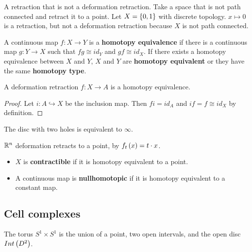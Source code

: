 \begin{example*}
A retraction that is not a deformation retraction. Take a space that is not path connected and retract it to a point. Let $ X = \left\{ 0, 1 \right\} $ with discrete topology. $ x \mapsto 0 $ is a retraction, but not a deformation retraction because $ X $ is not path connected.
\end{example*}

\begin{definition*}
A continuous map $ f : X \to Y $ is a \textbf{homotopy equivalence} if there is a continuous map $ g : Y \to X $ such that $ fg \cong id_Y $ and $ gf \cong id_X $. If there exists a homotopy equivalence between $ X $ and $ Y $, $ X $ and $ Y $ are \textbf{homotopy equivalent} or they have the same \textbf{homotopy type}.
\end{definition*}

\begin{lemma}
A deformation retraction $ f : X \to A $ is a homotopy equivalence.
\end{lemma}

\begin{proof}
Let $ i : A \hookrightarrow X $ be the inclusion map. Then $ fi = id_A $ and $ if = f \cong id_X $ by definition.
\end{proof}

\begin{example*}
The disc with two holes is equivalent to $ \infty $.
\end{example*}

\begin{example*}
$ \mathbb{R}^n $ deformation retracts to a point, by $ f_t\left( x \right) = t \cdot x $.
\end{example*}

\begin{definition*}
\hfill
\begin{itemize}
\item $ X $ is \textbf{contractible} if it is homotopy equivalent to a point.
\item A continuous map is \textbf{nullhomotopic} if it is homotopy equivalent to a constant map.
\end{itemize}
\end{definition*}

\subsection{Cell complexes}

\begin{example*}
The torus $ S^1 \times S^1 $ is the union of a point, two open intervals, and the open disc $ Int\left( D^2 \right) $.
\end{example*}

